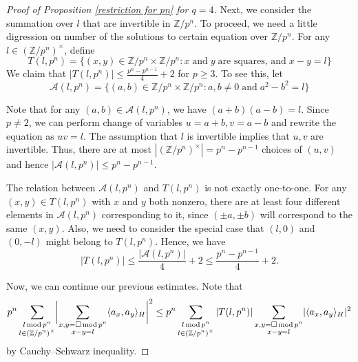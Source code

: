 \documentclass[11pt]{amsart}
\theoremstyle{plain} %
\theoremstyle{remark}
\numberwithin{equation}{section}
\newcommand{\Z}{\mathbb{Z}}
\DeclarePairedDelimiter\abs{\lvert}{\rvert}
\begin{document}
\begin{proof}[Proof of Proposition \ref{restriction for pn} for $q=4$]
    Next, we consider the summation over $l$ that are invertible in $\Z/p^n$. To proceed, we need a little digression on number of the solutions to certain equation over $\Z/p^n$. For any $l\in (\Z/p^n)^{\times}$, define
    \begin{equation*}
        T(l,p^n)=\{(x,y)\in \Z/p^n\times \Z/p^n:x\;\text{and}\;y\;\text{are squares, and}\;x-y=l\}
    \end{equation*}
    We claim that $|T(l,p^n)|\leq \frac{p^n-p^{n-1}}{4}+2$ for $p\geq 3$. To see this, let
    \begin{equation*}
        \mathcal{A}(l,p^n)=\{(a,b)\in \Z/p^n\times \Z/p^n:a,b\neq 0\;\text{and}\;a^2-b^2=l\}
    \end{equation*}

    Note that for any $(a,b)\in \mathcal{A}(l,p^n)$, we have $(a+b)(a-b)=l$. Since $p\neq 2$, we can perform change of variables $u=a+b,v=a-b$ and rewrite the equation as $uv=l$. The assumption that $l$ is invertible implies that $u,v$ are invertible. Thus, there are at most $|(\Z/p^n)^{\times}|=p^n-p^{n-1}$ choices of $(u,v)$ and hence $|\mathcal{A}(l,p^n)|\leq p^n-p^{n-1}$.

    The relation between $\mathcal{A}(l,p^n)$ and $T(l,p^n)$ is not exactly one-to-one. For any $(x,y)\in T(l,p^n)$ with $x$ and $y$ both nonzero, there are at least four different elements in $\mathcal{A}(l,p^n)$ corresponding to it, since $(\pm a,\pm b)$ will correspond to the same $(x,y)$. Also, we need to consider the special case that $(l,0)$ and $(0,-l)$ might belong to $T(l,p^n)$. Hence, we have 
    \begin{equation*}
        |T(l,p^n)|\leq \frac{|\mathcal{A}(l,p^n)|}{4}+2\leq \frac{p^n-p^{n-1}}{4}+2.
    \end{equation*}

    Now, we can continue our previous estimates. Note that
    \begin{equation*}
        p^n \sum_{\substack{l\,\mathrm{mod}\,p^n\\l\in (\Z/p^n)^{\times}}}\abs[\bigg]{\sum_{\substack{x,y=\square\,\mathrm{mod}\,p^n\\x-y=l}} \langle a_x,a_y \rangle_H}^2 \leq p^n \sum_{\substack{l\,\mathrm{mod}\,p^n\\l\in (\Z/p^n)^{\times}}} |T(l,p^n)|\sum_{\substack{x,y=\square\,\mathrm{mod}\,p^n\\x-y=l}} \abs{\langle a_x,a_y \rangle_H}^2
    \end{equation*}
    by Cauchy--Schwarz inequality.


\end{proof}
\end{document}
